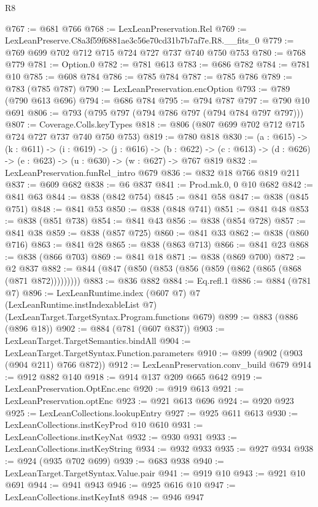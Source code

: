 \begin{lexlean}{R8}
\begin{coremodule}
@767 := @681 @766
@768 := LexLeanPreservation.Rel
@769 := LexLeanPreserve.C8a3f59f6881ae3c56e70cd31b7b7af7e.R8.__fits_0
@779 := @769 @699 @702 @712 @715 @724 @727 @737 @740 @750 @753
@780 := @768 @779
@781 := Option.{0}
@782 := @781 @613
@783 := @686 @782
@784 := @781 @10
@785 := @608 @784
@786 := @785 @784
@787 := @785 @786
@789 := @783 (@785 @787)
@790 := LexLeanPreservation.encOption
@793 := @789 (@790 @613 @696)
@794 := @686 @784
@795 := @794 @787
@797 := @790 @10 @691
@806 := @793 (@795 @797 (@794 @786 @797 (@794 @784 @797 @797)))
@807 := Coverage.Colls.keyTypes
@818 := @806 (@807 @699 @702 @712 @715 @724 @727 @737 @740 @750 @753)
@819 := @780 @818
@830 := (a : @615) ->
  (k : @611) ->
  (i : @619) ->
  (j : @616) ->
  (b : @622) -> (c : @613) -> (d : @626) -> (e : @623) -> (u : @630) -> (w : @627) -> @767 @819
@832 := LexLeanPreservation.funRel_intro @679
@836 := @832 @18 @766 @819 @211
@837 := @609 @682
@838 := @6 @837
@841 := Prod.mk.{0, 0} @10 @682
@842 := @841 @63
@844 := @838 (@842 @754)
@845 := @841 @58
@847 := @838 (@845 @751)
@848 := @841 @53
@850 := @838 (@848 @741)
@851 := @841 @48
@853 := @838 (@851 @738)
@854 := @841 @43
@856 := @838 (@854 @728)
@857 := @841 @38
@859 := @838 (@857 @725)
@860 := @841 @33
@862 := @838 (@860 @716)
@863 := @841 @28
@865 := @838 (@863 @713)
@866 := @841 @23
@868 := @838 (@866 @703)
@869 := @841 @18
@871 := @838 (@869 @700)
@872 := @2 @837
@882 := @844 (@847 (@850 (@853 (@856 (@859 (@862 (@865 (@868 (@871 @872)))))))))
@883 := @836 @882
@884 := Eq.refl.{1}
@886 := @884 (@781 @7)
@896 := LexLeanRuntime.index
    (@607 @7)
    @7
    (LexLeanRuntime.instIndexableList @7)
    (LexLeanTarget.TargetSyntax.Program.functions @679)
@899 := @883 (@886 (@896 @18))
@902 := @884 (@781 (@607 @837))
@903 := LexLeanTarget.TargetSemantics.bindAll
@904 := LexLeanTarget.TargetSyntax.Function.parameters
@910 := @899 (@902 (@903 (@904 @211) @766 @872))
@912 := LexLeanPreservation.conv_build @679
@914 := @912 @882 @140
@918 := @914 @137 @209 @665 @642
@919 := LexLeanPreservation.OptEnc.enc
@920 := @919 @613
@921 := LexLeanPreservation.optEnc
@923 := @921 @613 @696
@924 := @920 @923
@925 := LexLeanCollections.lookupEntry
@927 := @925 @611 @613
@930 := LexLeanCollections.instKeyProd @10 @610
@931 := LexLeanCollections.instKeyNat
@932 := @930 @931
@933 := LexLeanCollections.instKeyString
@934 := @932 @933
@935 := @927 @934
@938 := @924 (@935 @702 @699)
@939 := @683 @938
@940 := LexLeanTarget.TargetSyntax.Value.pair
@941 := @919 @10
@943 := @921 @10 @691
@944 := @941 @943
@946 := @925 @616 @10
@947 := LexLeanCollections.instKeyInt8
@948 := @946 @947

\end{coremodule}
\end{lexlean}
